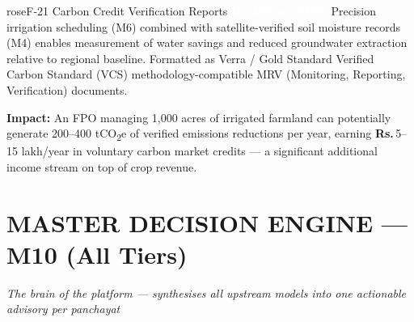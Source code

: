 \documentclass[12pt,a4paper]{article}
\newcommand{\Rup}{\textbf{Rs.\,}}
\newcommand{\bizzbadge}{\textcolor{white}{\colorbox{amber}{\footnotesize\textbf{\Rup499/mo}}}}
\newcommand{\newbadge}{\textcolor{white}{\colorbox{rose}{\footnotesize\textbf{NEW}}}}
\begin{document}
\begin{featurebox}{rose}{F-21 \quad Carbon Credit Verification Reports \quad \bizzbadge\quad\newbadge}
Precision irrigation scheduling (M6) combined with satellite-verified soil moisture records (M4) enables measurement of water savings and reduced groundwater extraction relative to regional baseline. Formatted as Verra / Gold Standard Verified Carbon Standard (VCS) methodology-compatible MRV (Monitoring, Reporting, Verification) documents.

\textbf{Impact:} An FPO managing 1,000 acres of irrigated farmland can potentially generate 200--400 tCO\textsubscript{2}e of verified emissions reductions per year, earning \Rup5--15 lakh/year in voluntary carbon market credits --- a significant additional income stream on top of crop revenue.
\end{featurebox}

\section{MASTER DECISION ENGINE --- M10 (All Tiers)}
\textit{The brain of the platform --- synthesises all upstream models into one actionable advisory per panchayat}
\end{document}
